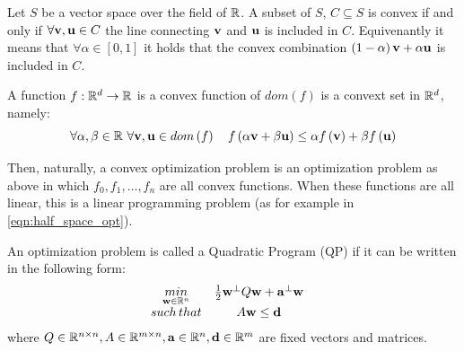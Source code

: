 \begin{definition}
Let $S$ be a vector space over the field of $\mathbb{R}$. A subset of $S$, $C\subseteq S$ is convex if and only if $\forall \mathbf{v},\mathbf{u}\in C $ the line connecting $\mathbf{v}$ and $\mathbf{u}$ is included in $C$. Equivenantly it means that $\forall \alpha\in\left[0,1\right]$ it holds that the convex combination $\left(1-\alpha\right)\mathbf{v}+ \alpha\mathbf{u}$ is included in $C$.
\end{definition}

\begin{definition}
A function $f:\mathbb{R}^d\rightarrow\mathbb{R}$ is a convex function of $dom\left(f\right)$ is a convext set in $\mathbb{R}^d$, namely: $$ \forall\alpha,\beta\in\mathbb{R}\,\,\forall\mathbf{v},\mathbf{u}\in dom\left(f\right)\quad f\left(\alpha\mathbf{v}+\beta\mathbf{u}\right) \leq \alpha f\left(\mathbf{v}\right) + \beta f\left(\mathbf{u}\right)$$
\end{definition}

Then, naturally, a convex optimization problem is an optimization problem as above in which $f_0,f_1,\ldots,f_n$ are all convex functions. When these functions are all linear, this is a linear programming problem (as for example in \ref{eqn:half_space_opt}).

\begin{definition}
An optimization problem is called a Quadratic Program (QP) if it can be written in the following form:
$$
\begin{array}{ccc}
\underset{\mathbf{w}\in\mathbb{R}^n}{min} & \frac{1}{2}\mathbf{w}^\perp Q\mathbf{w} + \mathbf{a}^\perp\mathbf{w} & \\
such\,that & A\mathbf{w} \leq \mathbf{d} \\
\end{array}
$$
where $Q\in\mathbb{R}^{n\times n}, A\in\mathbb{R}^{m\times n},\mathbf{a}\in\mathbb{R}^n,\mathbf{d}\in\mathbb{R}^m$ are fixed vectors and matrices.
\end{definition}

